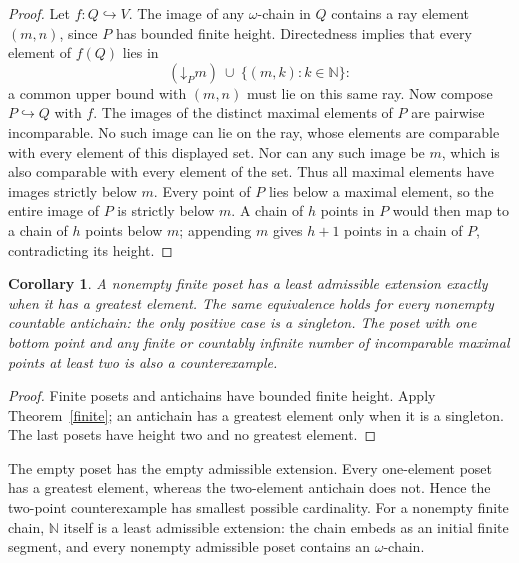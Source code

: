 \documentclass[11pt]{article}
\newtheorem{corollary}[theorem]{Corollary}
\newcommand{\N}{\mathbb N}
\begin{document}
\begin{proof}
Let $f:Q\hookrightarrow V$. The image of any $\omega$-chain in $Q$ contains
a ray element $(m,n)$, since $P$ has bounded finite height. Directedness
implies that every element of $f(Q)$ lies in
\[
 (\mathord\downarrow_P m)\ \cup\ \{(m,k):k\in\N\}:
\]
a common upper bound with $(m,n)$ must lie on this same ray. Now compose
$P\hookrightarrow Q$ with $f$. The images of the distinct maximal elements
of $P$ are pairwise incomparable. No such image can lie on the ray, whose
elements are comparable with every element of this displayed set. Nor can
any such image be $m$, which is also comparable with every element of the
set. Thus all maximal elements have images strictly below $m$. Every point
of $P$ lies below a maximal element, so the entire image of $P$ is strictly
below $m$. A chain of $h$ points in $P$ would then map to a chain of $h$
points below $m$; appending $m$ gives $h+1$ points in a chain of $P$,
contradicting its height.
\end{proof}

\begin{corollary}\label{finitecase}
A nonempty finite poset has a least admissible extension exactly when it
has a greatest element. The same equivalence holds for every nonempty
countable antichain: the only positive case is a singleton.
The poset with one bottom point and any finite or countably infinite
number of incomparable maximal points at least two is also a counterexample.
\end{corollary}
\begin{proof}
Finite posets and antichains have bounded finite height. Apply
Theorem~\ref{finite}; an antichain has a greatest element only when it is
a singleton.
The last posets have height two and no greatest element.
\end{proof}

The empty poset has the empty admissible extension. Every one-element poset
has a greatest element, whereas the two-element antichain does not. Hence
the two-point counterexample has smallest possible cardinality. For a nonempty
finite chain, $\N$ itself is a least admissible extension: the chain embeds
as an initial finite segment, and every nonempty admissible poset contains
an $\omega$-chain.
\end{document}
